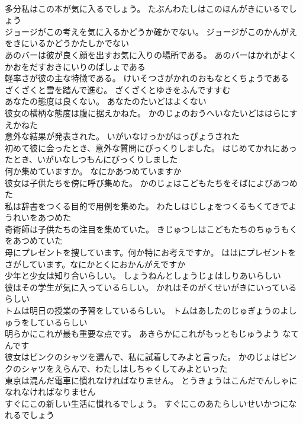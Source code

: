 \documentclass[8pt]{extreport}
\begin{document}
\begin{CJK}{UTF8}{min}
\\	多分私はこの本が気に入るでしょう。	たぶんわたしはこのほんがきにいるでしょう 
\\	ジョージがこの考えを気に入るかどうか確かでない。	ジョージがこのかんがえをきにいるかどうかたしかでない 
\\	あのバーは彼が良く顔を出すお気に入りの場所である。	あのバーはかれがよくかおをだすおきにいりのばしょである 
\\	軽率さが彼の主な特徴である。	けいそつさがかれのおもなとくちょうである 
\\	ざくざくと雪を踏んで進む。	ざくざくとゆきをふんですすむ 
\\	あなたの態度は良くない。	あなたのたいどはよくない 
\\	彼女の横柄な態度は腹に据えかねた。	かのじょのおうへいなたいどははらにすえかねた 
\\	意外な結果が発表された。	いがいなけっかがはっぴょうされた 
\\	初めて彼に会ったとき、意外な質問にびっくりしました。	はじめてかれにあったとき、いがいなしつもんにびっくりしました 
\\	何か集めていますか。	なにかあつめていますか 
\\	彼女は子供たちを傍に呼び集めた。	かのじょはこどもたちをそばによびあつめた 
\\	私は辞書をつくる目的で用例を集めた。	わたしはじしょをつくるもくてきでようれいをあつめた 
\\	奇術師は子供たちの注目を集めていた。	きじゅつしはこどもたちのちゅうもくをあつめていた 
\\	母にプレゼントを捜しています。何か特にお考えですか。	ははにプレゼントをさがしています。なにかとくにおかんがえですか 
\\	少年と少女は知り合いらしい。	しょうねんとしょうじょはしりあいらしい 
\\	彼はその学生が気に入っているらしい。	かれはそのがくせいがきにいっているらしい 
\\	トムは明日の授業の予習をしているらしい。	トムはあしたのじゅぎょうのよしゅうをしているらしい 
\\	明らかにこれが最も重要な点です。	あきらかにこれがもっともじゅうよう なてんです 
\\	彼女はピンクのシャツを選んで、私に試着してみよと言った。	かのじょはピンクのシャツをえらんで、わたしはしちゃくしてみよといった 
\\	東京は混んだ電車に慣れなければなりません。	とうきょうはこんだでんしゃになれなければなりません 
\\	すぐにこの新しい生活に慣れるでしょう。	すぐにこのあたらしいせいかつになれるでしょう 

\end{CJK}
\end{document}

